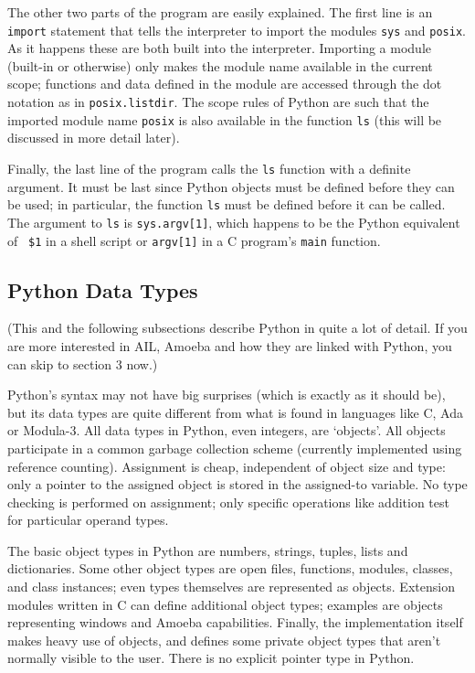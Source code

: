 The other two parts of the program are easily explained.  The first
line is an {\tt import} statement that tells the interpreter to import
the modules {\tt sys} and {\tt posix}.  As it happens these are both
built into the interpreter.  Importing a module (built-in or
otherwise) only makes the module name available in the current scope;
functions and data defined in the module are accessed through the dot
notation as in {\tt posix.listdir}.  The scope rules of Python are
such that the imported module name {\tt posix} is also available in
the function {\tt ls} (this will be discussed in more detail later).

Finally, the last line of the program calls the {\tt ls} function with
a definite argument.  It must be last since Python objects must be
defined before they can be used; in particular, the function {\tt ls}
must be defined before it can be called.  The argument to {\tt ls} is
{\tt sys.argv[1]}, which happens to be the Python equivalent of {\tt
\$1} in a shell script or {\tt argv[1]} in a C program's {\tt main}
function.

\subsection{Python Data Types}

(This and the following subsections describe Python in quite a lot of
detail.  If you are more interested in AIL, Amoeba and how they are
linked with Python, you can skip to section 3 now.)

Python's syntax may not have big surprises (which is exactly as it
should be), but its data types are quite different from what is found
in languages like C, Ada or Modula-3.  All data types in Python, even
integers, are `objects'.  All objects participate in a common garbage
collection scheme (currently implemented using reference counting).
Assignment is cheap, independent of object size and type: only a
pointer to the assigned object is stored in the assigned-to variable.
No type checking is performed on assignment; only specific operations
like addition test for particular operand types.

The basic object types in Python are numbers, strings, tuples, lists
and dictionaries.  Some other object types are open files, functions,
modules, classes, and class instances; even types themselves are
represented as objects.  Extension modules written in C can define
additional object types; examples are objects representing windows and
Amoeba capabilities.  Finally, the implementation itself makes heavy
use of objects, and defines some private object types that aren't
normally visible to the user.  There is no explicit pointer type in
Python.

